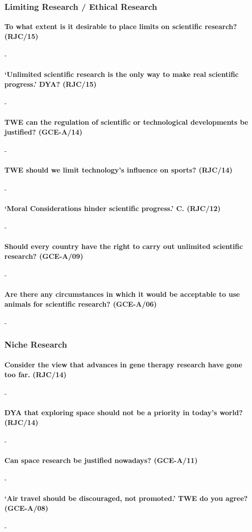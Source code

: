 \documentclass[../../main]{subfiles}
\begin{document}
\subsubsection{Limiting Research / Ethical Research}

\paragraph{To what extent is it desirable to place limits on scientific research? (RJC/15)}-

\paragraph{`Unlimited scientific research is the only way to make real scientific progress.' DYA? (RJC/15)}-

\paragraph{TWE can the regulation of scientific or technological developments be justified? (GCE-A/14)}-

\paragraph{TWE should we limit technology's influence on sports? (RJC/14)}-

\paragraph{`Moral Considerations hinder scientific progress.' C. (RJC/12)}-

\paragraph{Should every country have the right to carry out unlimited scientific research? (GCE-A/09)}-

\paragraph{Are there any circumstances in which it would be acceptable to use animals for scientific research? (GCE-A/06)}-

\subsubsection{Niche Research}

\paragraph{Consider the view that advances in gene therapy research have gone too far. (RJC/14)}-

\paragraph{DYA that exploring space should not be a priority in today's world? (RJC/14)}-

\paragraph{Can space research be justified nowadays? (GCE-A/11)}-

\paragraph{`Air travel should be discouraged, not promoted.' TWE do you agree? (GCE-A/08)}-
\end{document}
